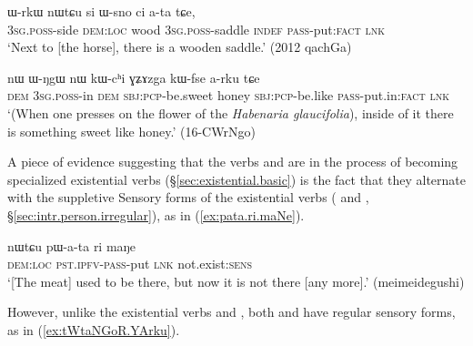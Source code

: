 \begin{exe}
\ex \label{ex:Wsno.ata}
 \gll ɯ-rkɯ nɯtɕu si ɯ-sno ci a-ta tɕe, \\
\textsc{3sg}.\textsc{poss}-side \textsc{dem}:\textsc{loc} wood \textsc{3sg}.\textsc{poss}-saddle \textsc{indef} \textsc{pass}-put:\textsc{fact} \textsc{lnk} \\
\glt `Next to [the horse], there is a wooden saddle.' (2012 qachGa) 
\end{exe}

\begin{exe}
\ex \label{ex:WNgW.arku}
 \gll %
 nɯ ɯ-ŋgɯ nɯ kɯ-cʰi ɣʑɤzga kɯ-fse a-rku tɕe \\
 \textsc{dem} \textsc{3sg}.\textsc{poss}-in \textsc{dem} \textsc{sbj}:\textsc{pcp}-be.sweet honey \textsc{sbj}:\textsc{pcp}-be.like \textsc{pass}-put.in:\textsc{fact} \textsc{lnk} \\
 \glt `(When one presses on the flower of the \textit{Habenaria glaucifolia}), inside of it there is something sweet like honey.' (16-CWrNgo) 
  \end{exe}

A piece of evidence suggesting that the verbs   and  are in the process of becoming specialized existential verbs (§\ref{sec:existential.basic}) is the fact that they alternate with the suppletive Sensory forms of the existential verbs ( and , §\ref{sec:intr.person.irregular}), as in (\ref{ex:pata.ri.maNe}). 

\begin{exe}
\ex \label{ex:pata.ri.maNe}
 \gll nɯtɕu pɯ-a-ta ri maŋe \\
 \textsc{dem}:\textsc{loc} \textsc{pst}.\textsc{ipfv}-\textsc{pass}-put \textsc{lnk} not.exist:\textsc{sens} \\
\glt `[The meat] used to be there, but now it is not there [any more].' (meimeidegushi)
  \end{exe}

However, unlike the existential verbs  and , both    and  have regular sensory forms, as in (\ref{ex:tWtaNGoR.YArku}).

